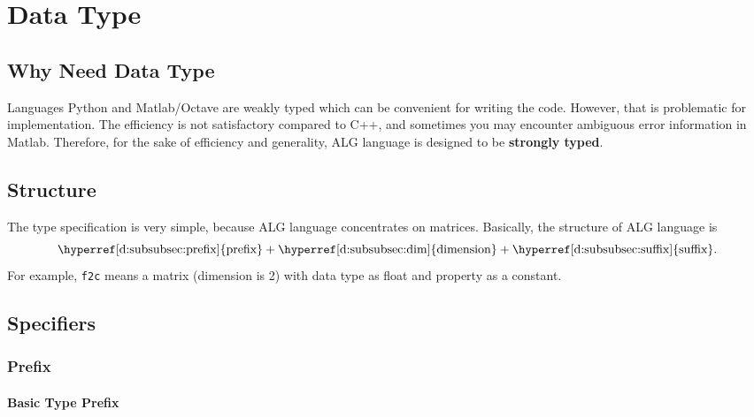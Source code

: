 \section{Data Type}\label{d:sec:data_type}

\subsection{Why Need Data Type}
Languages Python and Matlab/Octave are weakly typed
which can be convenient for writing the code.
However, that is problematic for implementation.
The efficiency is not satisfactory compared to C++,
and sometimes you may encounter ambiguous error information in Matlab.
Therefore, for the sake of efficiency and generality,
ALG language is designed to be \textbf{strongly typed}.

\subsection{Structure}
The type specification is very simple,
because ALG language concentrates on matrices.
Basically, the structure of ALG language is
\[
  \text{\hyperref[d:subsubsec:prefix]{prefix}}+
  \text{\hyperref[d:subsubsec:dim]{dimension}}+
  \text{\hyperref[d:subsubsec:suffix]{suffix}}.
\]
For example, \texttt{f2c} means a matrix (dimension is 2) with data type as float
and property as a constant.

\subsection{Specifiers}

\subsubsection{Prefix}\label{d:subsubsec:prefix}

\paragraph{Basic Type Prefix}


